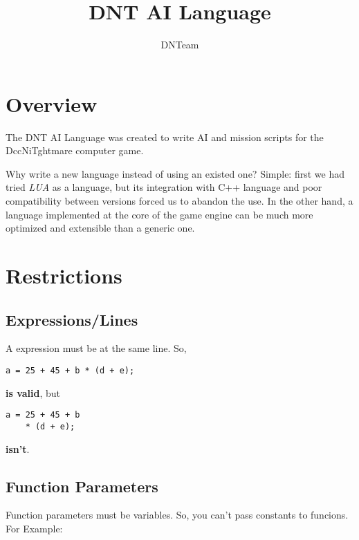 \documentclass[ letterpaper,12pt]{article}
\begin{document}
\title{\textbf{DNT AI Language}}

\author
{
DNTeam
}

\maketitle

\newpage

\tableofcontents

\newpage

\section{Overview}

   The DNT AI Language was created to write AI and mission scripts for the
DccNiTghtmare computer game. 

   Why write a new language instead of using an existed one? Simple: first we
had tried {\it LUA} as a language, but its integration with C++ language and poor
compatibility between versions forced us to abandon the use. In the other hand,
a language implemented at the core of the game engine can be much more optimized
and extensible than a generic one.

\section{Restrictions}

\subsection{Expressions/Lines}
A expression must be at the same line. So,

\begin{verbatim}
a = 25 + 45 + b * (d + e);
\end{verbatim}

{\bf is valid}, but

\begin{verbatim}
a = 25 + 45 + b 
    * (d + e);
\end{verbatim}

{\bf isn't}.

\subsection{Function Parameters}

Function parameters must be variables. So, you can't pass constants to funcions.
For Example:
\end{document}
